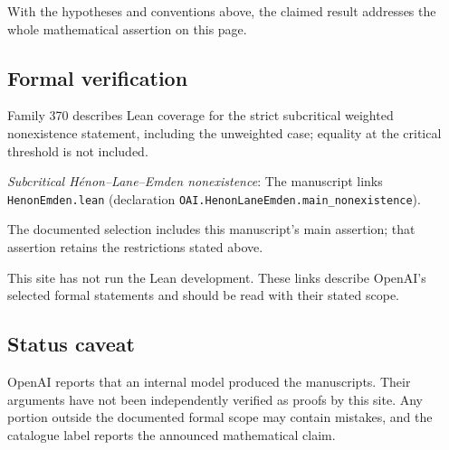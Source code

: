 \documentclass[11pt]{article}
\begin{document}
With the hypotheses and conventions above, the claimed result addresses the whole mathematical assertion on this page.

\subsection{Formal verification}
Family 370 describes Lean coverage for the strict subcritical weighted nonexistence statement, including the unweighted case; equality at the critical threshold is not included.

\textit{Subcritical Hénon--Lane--Emden nonexistence}: The manuscript links \texttt{HenonEmden.lean} (declaration \texttt{OAI.HenonLaneEmden.main\_nonexistence}).

The documented selection includes this manuscript’s main assertion; that assertion retains the restrictions stated above.

This site has not run the Lean development. These links describe OpenAI’s selected formal statements and should be read with their stated scope.

\subsection{Status caveat}
OpenAI reports that an internal model produced the manuscripts. Their arguments have not been independently verified as proofs by this site. Any portion outside the documented formal scope may contain mistakes, and the catalogue label reports the announced mathematical claim.
\end{document}
